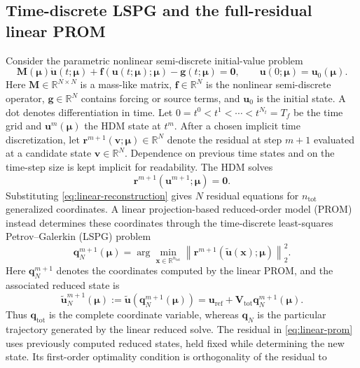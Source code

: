 \documentclass[11pt]{article}
\newcommand{\q}{\mathbf q}
\newcommand{\qtot}{\mathbf q_{\mathrm{tot}}}
\newcommand{\uvec}{\mathbf u}
\newcommand{\utilde}{\widetilde{\mathbf u}}
\newcommand{\mub}{\bm\mu}
\newcommand{\norm}[1]{\left\lVert #1 \right\rVert}
\begin{document}
\subsection{Time-discrete LSPG and the full-residual linear PROM}
Consider the parametric nonlinear semi-discrete initial-value problem
\begin{equation}
\mathbf M(\mub)\dot{\uvec}(t;\mub)+\mathbf f(\uvec(t;\mub);\mub)
-\mathbf g(t;\mub)=\mathbf0,\qquad
\uvec(0;\mub)=\uvec_0(\mub).
\label{eq:ivp}
\end{equation}
Here $\mathbf M\in\mathbb R^{N\times N}$ is a mass-like matrix,
$\mathbf f\in\mathbb R^N$ is the nonlinear semi-discrete operator,
$\mathbf g\in\mathbb R^N$ contains forcing or source terms, and
$\uvec_0$ is the initial state.  A dot denotes differentiation in time.
Let $0=t^0<t^1<\cdots<t^{N_t}=T_f$ be the time grid and
$\uvec^m(\mub)$ the HDM state at $t^m$.
After a chosen implicit time discretization, let
$\mathbf r^{m+1}(\mathbf v;\mub)\in\mathbb R^N$ denote the residual at
step $m+1$ evaluated at a candidate state $\mathbf v\in\mathbb R^N$.
Dependence on previous time states and on the time-step size is kept
implicit for readability.  The HDM solves
\begin{equation}
\mathbf r^{m+1}(\uvec^{m+1};\mub)=\mathbf0.
\label{eq:discrete-residual}
\end{equation}
Substituting \eqref{eq:linear-reconstruction} gives $N$ residual equations
for $n_{\mathrm{tot}}$ generalized coordinates.  A linear projection-based
reduced-order model (PROM) instead determines these coordinates through
the time-discrete least-squares Petrov--Galerkin (LSPG) problem
\begin{equation}
\q_N^{m+1}(\mub)
=\arg\min_{\mathbf x\in\mathbb R^{n_{\mathrm{tot}}}}
\norm{\mathbf r^{m+1}(\utilde(\mathbf x);\mub)}_2^2.
\label{eq:linear-prom}
\end{equation}
Here $\q_N^{m+1}$ denotes the coordinates computed by the linear PROM,
and the associated reduced state is
\begin{equation}
\utilde_N^{m+1}(\mub)
:=\utilde(\q_N^{m+1}(\mub))
=\uvec_{\mathrm{ref}}+\mathbf V_{\mathrm{tot}}\q_N^{m+1}(\mub).
\label{eq:linear-reference-state}
\end{equation}
Thus $\qtot$ is the complete coordinate variable, whereas $\q_N$ is the
particular trajectory generated by the linear reduced solve.
The residual in \eqref{eq:linear-prom} uses previously computed reduced
states, held fixed while determining the new state.
Its first-order optimality condition is orthogonality of the residual to
\end{document}
